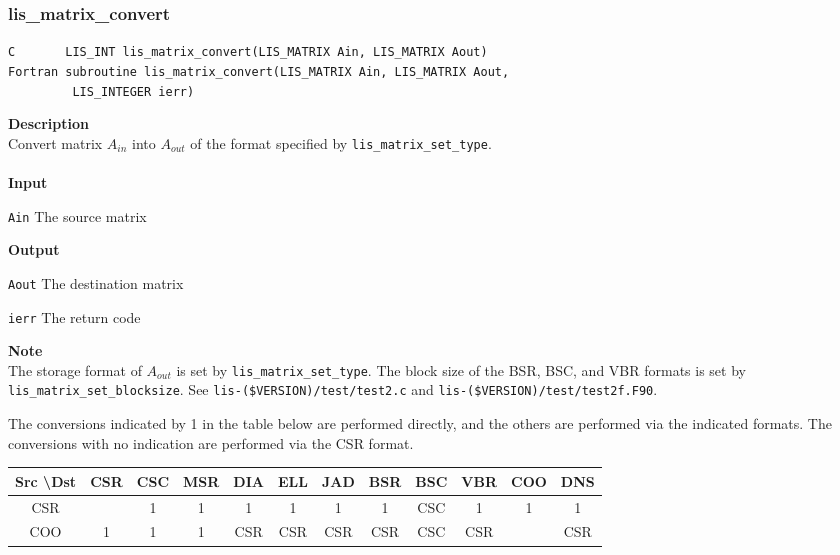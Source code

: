 \documentclass[a4paper]{article}
\newcommand{\namelistlabel}[1]{\mbox{#1}\hfill}
\newenvironment{namelist}[1]{%
\begin{list}{}
  {\let\makelabel\namelistlabel
  \settowidth{\labelwidth}{#1}
  \setlength{\leftmargin}{1.1\labelwidth}}
  }{%
\end{list}}
\begin{document}
\newpage
\subsubsection{lis\_matrix\_convert}
\begin{screen}
\verb|C       LIS_INT lis_matrix_convert(LIS_MATRIX Ain, LIS_MATRIX Aout)|\\
\verb|Fortran subroutine lis_matrix_convert(LIS_MATRIX Ain, LIS_MATRIX Aout,|\\
\verb|         LIS_INTEGER ierr)|
\end{screen}
{\bf Description}\\
\indent
Convert matrix $A_{in}$ into $A_{out}$ of the format specified by {\tt lis\_matrix\_set\_type}.
\\ \\
\noindent
{\bf Input}
\begin{namelist}{XXXXXXXXXXXXXXXXXXXX}
\item[\tt Ain] The source matrix
\end{namelist}
{\bf Output}
\begin{namelist}{XXXXXXXXXXXXXXXXXXXX}
\item[\tt Aout] The destination matrix
\item[\tt ierr] The return code
\end{namelist}
{\bf Note}\\
\indent
The storage format of $A_{out}$ is set by \verb|lis_matrix_set_type|. 
The block size of the BSR, BSC, and VBR formats is set by \verb|lis_matrix_set_blocksize|. See {\tt lis-(\$VERSION)/test/test2.c} and
{\tt lis-(\$VERSION)/test/test2f.F90}.

The conversions indicated by 1 in the table below are performed directly, 
and the others are performed via the indicated formats. 
The conversions with no indication are performed via the CSR format.
\vspace*{5mm}

\begin{tabular}{|c|c|c|c|c|c|c|c|c|c|c|c|}
\hline
Src \textbackslash Dst & CSR & CSC & MSR & DIA & ELL & JAD & BSR & BSC & VBR & COO & DNS \\ \hline
CSR    &     &  1  &  1  &  1  &  1  &  1  &  1  &  CSC  &  1  &  1  &  1  \\ \hline
COO    &  1  &  1  &  1  & CSR  & CSR & CSR & CSR & CSC & CSR &     & CSR   \\ \hline
\end{tabular}

\newpage
\end{document}
